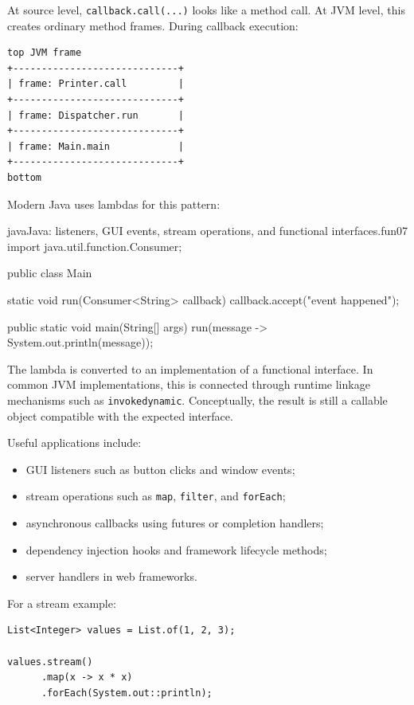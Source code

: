 At source level, \texttt{callback.call(...)} looks like a method call. At JVM level, this creates ordinary method frames. During callback execution:

\begin{verbatim}
top JVM frame
+-----------------------------+
| frame: Printer.call         |
+-----------------------------+
| frame: Dispatcher.run       |
+-----------------------------+
| frame: Main.main            |
+-----------------------------+
bottom
\end{verbatim}

Modern Java uses lambdas for this pattern:

\begin{codebox}[]{java}{Java: listeners, GUI events, stream operations, and functional interfaces.}{fun07}
import java.util.function.Consumer;

public class Main {
    static void run(Consumer<String> callback) {
        callback.accept("event happened");
    }

    public static void main(String[] args) {
        run(message -> System.out.println(message));
    }
}
\end{codebox}


The lambda is converted to an implementation of a functional interface. In common JVM implementations, this is connected through runtime linkage mechanisms such as \texttt{invokedynamic}. Conceptually, the result is still a callable object compatible with the expected interface.

Useful applications include:

\begin{itemize}
    \item GUI listeners such as button clicks and window events;
    \item stream operations such as \texttt{map}, \texttt{filter}, and \texttt{forEach};
    \item asynchronous callbacks using futures or completion handlers;
    \item dependency injection hooks and framework lifecycle methods;
    \item server handlers in web frameworks.
\end{itemize}

For a stream example:

\begin{verbatim}
List<Integer> values = List.of(1, 2, 3);

values.stream()
      .map(x -> x * x)
      .forEach(System.out::println);
\end{verbatim}

